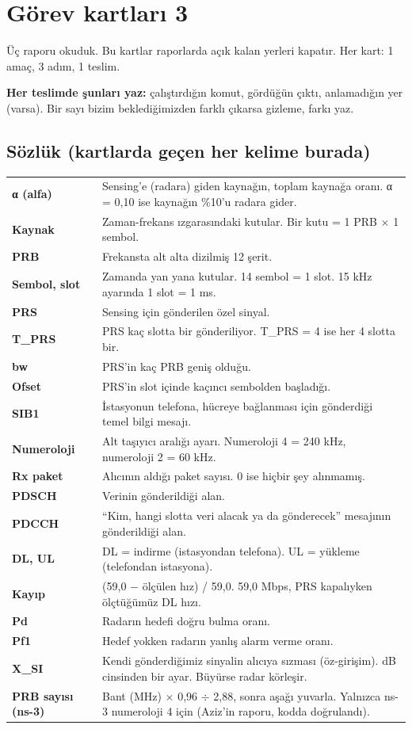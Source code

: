 \documentclass[11pt,a4paper]{article}
\begin{document}
\section*{Görev kartları 3}
{\sffamily\color{muted} Üç raporu okuduk. Bu kartlar raporlarda açık kalan yerleri kapatır. Her kart: 1 amaç, 3 adım, 1 teslim.}

\textbf{Her teslimde şunları yaz:} çalıştırdığın komut, gördüğün çıktı, anlamadığın yer (varsa). Bir sayı bizim beklediğimizden farklı çıkarsa gizleme, farkı yaz.

\subsection*{Sözlük (kartlarda geçen her kelime burada)}
\begingroup\sffamily\small
\begin{tabular}{@{}p{2.6cm}p{13.4cm}@{}}
\toprule
\textbf{α (alfa)} & Sensing'e (radara) giden kaynağın, toplam kaynağa oranı. α = 0,10 ise kaynağın \%10'u radara gider. \\
\textbf{Kaynak} & Zaman-frekans ızgarasındaki kutular. Bir kutu = 1 PRB $\times$ 1 sembol. \\
\textbf{PRB} & Frekansta alt alta dizilmiş 12 şerit. \\
\textbf{Sembol, slot} & Zamanda yan yana kutular. 14 sembol = 1 slot. 15 kHz ayarında 1 slot = 1 ms. \\
\textbf{PRS} & Sensing için gönderilen özel sinyal. \\
\textbf{T\_PRS} & PRS kaç slotta bir gönderiliyor. T\_PRS = 4 ise her 4 slotta bir. \\
\textbf{bw} & PRS'in kaç PRB geniş olduğu. \\
\textbf{Ofset} & PRS'in slot içinde kaçıncı sembolden başladığı. \\
\textbf{SIB1} & İstasyonun telefona, hücreye bağlanması için gönderdiği temel bilgi mesajı. \\
\textbf{Numeroloji} & Alt taşıyıcı aralığı ayarı. Numeroloji 4 = 240 kHz, numeroloji 2 = 60 kHz. \\
\textbf{Rx paket} & Alıcının aldığı paket sayısı. 0 ise hiçbir şey alınmamış. \\
\textbf{PDSCH} & Verinin gönderildiği alan. \\
\textbf{PDCCH} & ``Kim, hangi slotta veri alacak ya da gönderecek'' mesajının gönderildiği alan. \\
\textbf{DL, UL} & DL = indirme (istasyondan telefona). UL = yükleme (telefondan istasyona). \\
\textbf{Kayıp} & (59,0 $-$ ölçülen hız) / 59,0. 59,0 Mbps, PRS kapalıyken ölçtüğümüz DL hızı. \\
\textbf{Pd} & Radarın hedefi doğru bulma oranı. \\
\textbf{Pf1} & Hedef yokken radarın yanlış alarm verme oranı. \\
\textbf{X\_SI} & Kendi gönderdiğimiz sinyalin alıcıya sızması (öz-girişim). dB cinsinden bir ayar. Büyürse radar körleşir. \\
\textbf{PRB sayısı (ns-3)} & Bant (MHz) $\times$ 0,96 $\div$ 2,88, sonra aşağı yuvarla. Yalnızca ns-3 numeroloji 4 için (Aziz'in raporu, kodda doğrulandı). \\
\bottomrule
\end{tabular}
\end{document}
